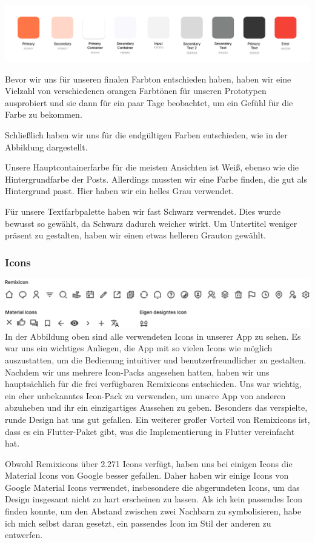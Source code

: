 \includegraphics[width=1\textwidth]{pics/colors.png}

Bevor wir uns für unseren finalen Farbton entschieden haben, haben wir eine Vielzahl von verschiedenen orangen Farbtönen für unseren Prototypen ausprobiert und sie dann für ein paar Tage beobachtet, um ein Gefühl für die Farbe zu bekommen.

Schließlich haben wir uns für die endgültigen Farben entschieden, wie in der Abbildung dargestellt.

Unsere Hauptcontainerfarbe für die meisten Ansichten ist Weiß, ebenso wie die Hintergrundfarbe der Posts. Allerdings mussten wir eine Farbe finden, die gut als Hintergrund passt. Hier haben wir ein helles Grau verwendet.

Für unsere Textfarbpalette haben wir fast Schwarz verwendet. Dies wurde bewusst so gewählt, da Schwarz dadurch weicher wirkt. Um Untertitel weniger präsent zu gestalten, haben wir einen etwas helleren Grauton gewählt.
\subsubsection{Icons}
\includegraphics[width=1\textwidth]{pics/icons.png}
In der Abbildung oben sind alle verwendeten Icons in unserer App zu sehen. Es war uns ein wichtiges Anliegen, die App mit so vielen Icons wie möglich auszustatten, um die Bedienung intuitiver und benutzerfreundlicher zu gestalten. Nachdem wir uns mehrere Icon-Packs angesehen hatten, haben wir uns hauptsächlich für die frei verfügbaren Remixicons entschieden. Uns war wichtig, ein eher unbekanntes Icon-Pack zu verwenden, um unsere App von anderen abzuheben und ihr ein einzigartiges Aussehen zu geben. Besonders das verspielte, runde Design hat uns gut gefallen. Ein weiterer großer Vorteil von Remixicons ist, dass es ein Flutter-Paket gibt, was die Implementierung in Flutter vereinfacht hat.

Obwohl Remixicons über 2.271 Icons verfügt, haben uns bei einigen Icons die Material Icons von Google besser gefallen. Daher haben wir einige Icons von Google Material Icons verwendet, insbesondere die abgerundeten Icons, um das Design insgesamt nicht zu hart erscheinen zu lassen. Als ich kein passendes Icon finden konnte, um den Abstand zwischen zwei Nachbarn zu symbolisieren, habe ich mich selbst daran gesetzt, ein passendes Icon im Stil der anderen zu entwerfen.
